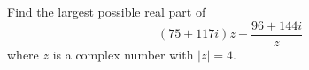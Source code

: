 Find the largest possible real part of $$(75+117i)z+\frac{96+144i}{z}$$where $z$ is a complex number with $|z|=4$.
